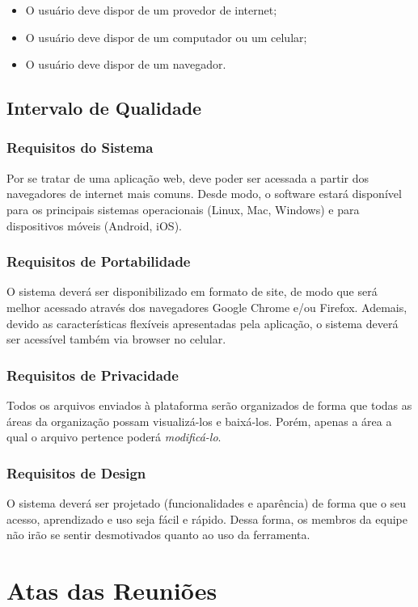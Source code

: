 \begin{apendicesenv}
\begin{itemize}
  \item O usuário deve dispor de um provedor de internet;
  \item O usuário deve dispor de um computador ou um celular;
  \item O usuário deve dispor de um navegador.
\end{itemize}

\section{Intervalo de Qualidade}
\subsection{Requisitos do Sistema}
Por se tratar de uma aplicação web, deve poder ser acessada a partir dos navegadores de internet mais comuns. Desde modo, o software estará disponível para os principais sistemas operacionais (Linux, Mac, Windows) e para dispositivos móveis (Android, iOS).

\subsection{Requisitos de Portabilidade}
O sistema deverá ser disponibilizado em formato de site, de modo que será melhor acessado através dos navegadores Google Chrome e/ou Firefox. Ademais, devido as características flexíveis apresentadas pela aplicação, o sistema deverá ser acessível também via browser no celular.

\subsection{Requisitos de Privacidade}
Todos os arquivos enviados à plataforma serão organizados de forma que todas as áreas da organização possam visualizá-los e baixá-los. Porém, apenas a área a qual o arquivo pertence poderá \textit{modificá-lo}.

\subsection{Requisitos de Design}
O sistema deverá ser projetado (funcionalidades e aparência) de forma que o seu acesso, aprendizado e uso seja fácil e rápido. Dessa forma, os membros da equipe não irão se sentir desmotivados quanto ao uso da ferramenta.


\chapter{Atas das Reuniões}
\label{appendix:reuniao1}


\end{apendicesenv}

